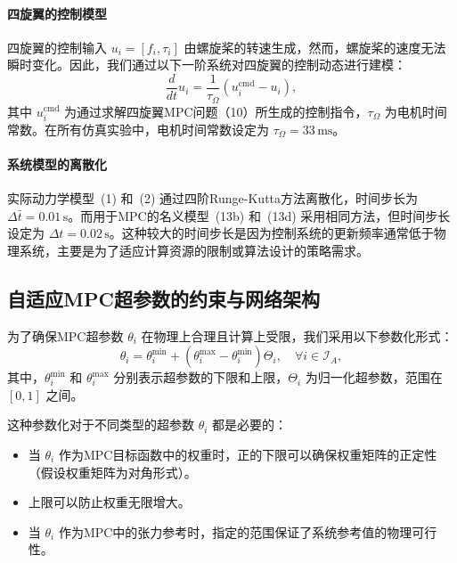 \documentclass[lang=chs, degree=master, blindreview=false, winfonts=true]{yanputhesis}
\begin{document}
\paragraph{四旋翼的控制模型} 四旋翼的控制输入 \( u_i = [f_i, \tau_i] \) 由螺旋桨的转速生成，然而，螺旋桨的速度无法瞬时变化。因此，我们通过以下一阶系统对四旋翼的控制动态进行建模：
\begin{equation}
    \frac{d}{dt} u_i = \frac{1}{\tau_\Omega} \left( u_i^\text{cmd} - u_i \right),
\end{equation}
其中 \( u_i^\text{cmd} \) 为通过求解四旋翼MPC问题（10）所生成的控制指令，\( \tau_\Omega \) 为电机时间常数。在所有仿真实验中，电机时间常数设定为 \( \tau_\Omega = 33 \, \text{ms} \)。

\paragraph{系统模型的离散化} 实际动力学模型~(1) 和~(2) 通过四阶Runge-Kutta方法离散化，时间步长为 \( \Delta \bar{t} = 0.01 \, \text{s} \)。而用于MPC的名义模型~(13b) 和~(13d) 采用相同方法，但时间步长设定为 \( \Delta t = 0.02 \, \text{s} \)。这种较大的时间步长是因为控制系统的更新频率通常低于物理系统，主要是为了适应计算资源的限制或算法设计的策略需求。

\subsection{自适应MPC超参数的约束与网络架构}

为了确保MPC超参数 \( \theta_i \) 在物理上合理且计算上受限，我们采用以下参数化形式：
\begin{equation}
    \theta_i = \theta_i^\text{min} + \left( \theta_i^\text{max} - \theta_i^\text{min} \right) \Theta_i, \quad \forall i \in \mathcal{I}_A,
\end{equation}
其中，\( \theta_i^\text{min} \) 和 \( \theta_i^\text{max} \) 分别表示超参数的下限和上限，\( \Theta_i \) 为归一化超参数，范围在 \([0, 1]\) 之间。

这种参数化对于不同类型的超参数 \( \theta_i \) 都是必要的：
\begin{itemize}
    \item 当 \( \theta_i \) 作为MPC目标函数中的权重时，正的下限可以确保权重矩阵的正定性（假设权重矩阵为对角形式）。
    \item 上限可以防止权重无限增大。
    \item 当 \( \theta_i \) 作为MPC中的张力参考时，指定的范围保证了系统参考值的物理可行性。
\end{itemize}
\end{document}

